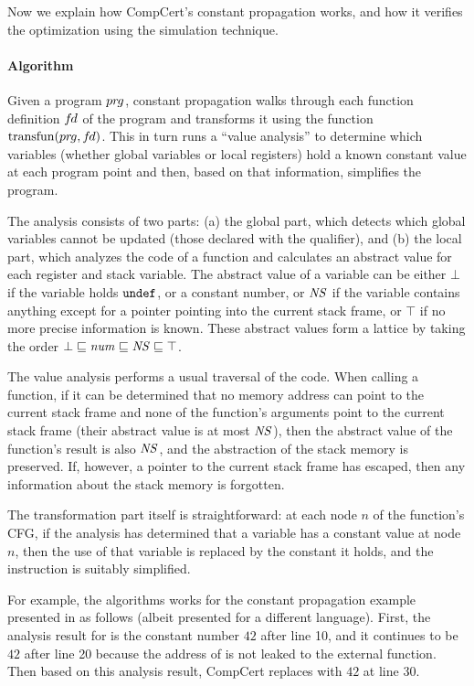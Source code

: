Now we explain how CompCert's constant propagation works, and how it verifies the optimization using
the simulation technique.

\paragraph{Algorithm}

Given a program ${pr\hspace*{-1pt}g}$, constant propagation walks through each function definition ${f\hspace*{-1pt}d}$ of the program 
and transforms it using the function $\mathrm{transfun}({pr\hspace*{-1pt}g}, {f\hspace*{-1pt}d})$.
This in turn runs a ``value analysis'' to determine which variables (whether global variables or local registers) hold a known constant value at each program point
and then, based on that information, simplifies the program.

The analysis consists of two parts: 
(a) the global part, which detects which global variables cannot be updated (\ie those declared with the  qualifier), and
(b) the local part, which analyzes the code of a function and calculates an abstract value for each register and stack variable.
The abstract value of a variable can be either $\bot$ if the variable holds $\mathtt{undef}$, 
or a constant number, 
or $\mathit{NS}$ if the variable contains anything except for a pointer pointing into the current stack frame, 
or $\top$ if no more precise information is known.
These abstract values form a lattice by taking the order $\bot \sqsubseteq \mathit{num} \sqsubseteq \mathit{NS} \sqsubseteq \top$.


The value analysis performs a usual traversal of the code. 
When calling a function, 
if it can be determined that no memory address can point to the current stack frame 
and none of the function's arguments point to the current stack frame (\ie their abstract value is at most $\mathit{NS}$), 
then the abstract value of the function's result is also $\mathit{NS}$, and the abstraction of the stack memory is preserved.
If, however, a pointer to the current stack frame has escaped, then any information about the stack memory is forgotten.

The transformation part itself is straightforward: 
at each node $n$ of the function's CFG, if the analysis has determined that a variable has a constant value at node $n$,
then the use of that variable is replaced by the constant it holds, and the instruction is suitably simplified.

For example, the algorithms works for the constant propagation example presented in
 as follows (albeit presented for a different language).  First, the
analysis result for  is the constant number $42$ after line 10, and it continues to be $42$
after line 20 because the address of  is not leaked to the external function.  Then based on
this analysis result, CompCert replaces  with $42$ at line 30.

